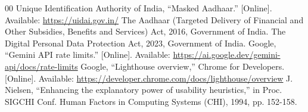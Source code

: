 \documentclass[conference]{IEEEtran}
\begin{document}
\begin{thebibliography}{00}
 Unique Identification Authority of India, ``Masked Aadhaar.'' [Online]. Available: \url{https://uidai.gov.in/}
 The Aadhaar (Targeted Delivery of Financial and Other Subsidies, Benefits and Services) Act, 2016, Government of India.
 The Digital Personal Data Protection Act, 2023, Government of India.
 Google, ``Gemini API rate limits.'' [Online]. Available: \url{https://ai.google.dev/gemini-api/docs/rate-limits}
 Google, ``Lighthouse overview,'' Chrome for Developers. [Online]. Available: \url{https://developer.chrome.com/docs/lighthouse/overview}
 J. Nielsen, ``Enhancing the explanatory power of usability heuristics,'' in Proc. SIGCHI Conf. Human Factors in Computing Systems (CHI), 1994, pp. 152-158.
\end{thebibliography}
\end{document}
